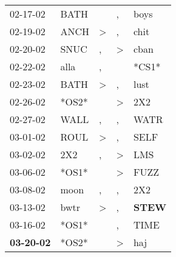 \begin{supertabular}{p{0.07\textwidth}p{0.06\textwidth}p{0.02\textwidth}p{0.02\textwidth}p{0.06\textwidth}}
          02-17-02\textsuperscript{} &           BATH\textsuperscript{} &                  &                , &           boys\textsuperscript{} \\
          02-19-02\textsuperscript{} &           ANCH\textsuperscript{} &     \textgreater &                , &           chit\textsuperscript{} \\
          02-20-02\textsuperscript{} &           SNUC\textsuperscript{} &                , &     \textgreater &           cban\textsuperscript{} \\
          02-22-02\textsuperscript{} &           alla\textsuperscript{} &                , &                  &                            *CS1* \\
          02-23-02\textsuperscript{} &           BATH\textsuperscript{} &     \textgreater &                , &           lust\textsuperscript{} \\
          02-26-02\textsuperscript{} &                            *OS2* &                  &     \textgreater &            2X2\textsuperscript{} \\
          02-27-02\textsuperscript{} &           WALL\textsuperscript{} &                , &                , &           WATR\textsuperscript{} \\
          03-01-02\textsuperscript{} &           ROUL\textsuperscript{} &     \textgreater &                , &           SELF\textsuperscript{} \\
          03-02-02\textsuperscript{} &            2X2\textsuperscript{} &                , &     \textgreater &            LMS\textsuperscript{} \\
          03-06-02\textsuperscript{} &                            *OS1* &                  &     \textgreater &           FUZZ\textsuperscript{} \\
          03-08-02\textsuperscript{} &           moon\textsuperscript{} &                , &                , &            2X2\textsuperscript{} \\
          03-13-02\textsuperscript{} &           bwtr\textsuperscript{} &     \textgreater &                , &  \textbf{STEW\textsuperscript{}} \\
          03-16-02\textsuperscript{} &                            *OS1* &                  &                , &           TIME\textsuperscript{} \\
 \textbf{03-20-02\textsuperscript{}} &                            *OS2* &                  &     \textgreater &            haj\textsuperscript{} \\

\end{supertabular}
